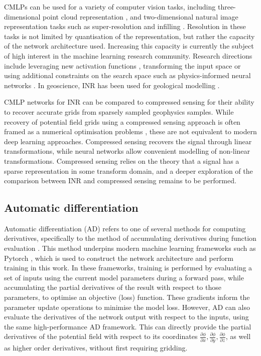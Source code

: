 CMLPs can be used for a variety of computer vision tasks, including three-dimensional point cloud representation \parencite{qiPointNetDeepHierarchical2017}, and two-dimensional natural image representation tasks such as super-resolution and infilling \parencite{leeLocalTextureEstimator2022, chenLearningContinuousImage2021}.
Resolution in these tasks is not limited by quantisation of the representation, but rather the capacity of the network architecture used.
Increasing this capacity is currently the subject of high interest in the machine learning research community.
Research directions include leveraging new activation functions \parencite{saragadamWIREWaveletImplicit2023}, transforming the input space \parencite[e.g.][]{benbarkaSeeingImplicitNeural2022} or using additional constraints on the search space such as physics-informed neural networks \parencite{raissiPhysicsinformedNeuralNetworks2019}.
In geoscience, INR has been used for geological modelling \parencite{hillierGeoINRImplicitNeural2023}.

CMLP networks for INR can be compared to compressed sensing \parencite{candesIntroductionCompressiveSampling2008} for their ability to recover accurate grids from sparsely sampled geophysics samples.
While recovery of potential field grids using a compressed sensing approach is often framed as a numerical optimisation problems \parencite[e.g.][]{yangAirborneGravimetryData2015,xuGravityAnomalyReconstruction2019}, these are not equivalent to modern deep learning approaches.
Compressed sensing recovers the signal through linear transformations, while neural networks allow convenient modelling of non-linear transformations.
Compressed sensing relies on the theory that a signal has a sparse representation in some transform domain, and a deeper exploration of the comparison between INR and compressed sensing remains to be performed.

\subsection{Automatic differentiation}
Automatic differentiation (AD) refers to one of several methods for computing derivatives, specifically to the method of accumulating derivatives during function evaluation \parencite{baydinAutomaticDifferentiationMachine2018}.
This method underpins modern machine learning frameworks such as Pytorch \parencite{paszkePyTorchImperativeStyle2019}, which is used to construct the network architecture and perform training in this work.
In these frameworks, training is performed by evaluating a set of inputs using the current model parameters during a forward pass, while accumulating the partial derivatives of the result with respect to those parameters, to optimise an objective (loss) function.
These gradients inform the parameter update operations to minimise the model loss.
However, AD can also evaluate the derivatives of the network output with respect to the inputs, using the same high-performance AD framework.
This can directly provide the partial derivatives of the potential field with respect to its coordinates \(\frac{\partial\phi{}}{\partial x}, \frac{\partial \phi{}}{\partial y}, \frac{\partial \phi{}}{\partial z}\), as well as higher order derivatives, without first requiring gridding.

